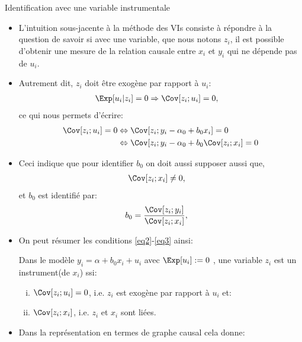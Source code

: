 \begin{frame}[allowframebreaks]{Identification avec une variable instrumentale}
    \begin{itemize}
\item L'intuition sous-jacente à la méthode des VIs consiste à répondre à la question 
de savoir si avec une variable, que nous notons $z_i$, il est possible d'obtenir 
une mesure de la relation causale entre $x_i$ et $y_i$ qui ne dépende pas de $u_i$.
\item Autrement dit, $z_i$ doit être exogène par rapport à $u_i$:
\begin{align}
\Exp[u_i| z_i] = 0 &\Rightarrow \Cov[z_i; u_i]= 0,
    \label{eq2}
\end{align}
ce qui nous permets d'écrire:
\begin{align*}
    \Cov[z_i; u_i]= 0 &\Leftrightarrow 
    \Cov[z_i; y_i - \alpha_0 +b_0x_i] = 0\\
    &\Leftrightarrow \Cov[z_i; y_i - \alpha_0 +b_0\Cov[z_i;x_i] = 0
\end{align*}
\item Ceci indique que pour identifier $b_0$  on doit aussi supposer aussi que,
\begin{align}
\Cov[z_i;x_i]  &\neq 0,
\label{eq3}
\end{align}
et $b_0$ est identifié par:
\begin{align}
b_0 &= \frac{\Cov[z_i; y_i]}{\Cov[z_i;x_i]},
    \label{eq4}
\end{align}
\framebreak

\item On peut résumer les conditions \eqref{eq2}-\eqref{eq3} ainsi: 

\begin{definition_fr}
    Dans le modèle $y_i = \alpha + b_0x_i + u_i$ avec $\Exp[u_i] := 0$ , une variable $z_i$ 
    est un instrument(de $x_i$) ssi:
    \begin{enumerate}[(i)]
\item $\Cov[z_i ;u_i ]= 0$, i.e. $z_i$ est exogène par rapport à $u_i$ et:
\item $\Cov[z_i;x_i]$, i.e. $z_i$ et $x_i$ sont liées.
\end{enumerate}
\end{definition_fr}

\item Dans la représentation en termes de graphe causal cela donne:


\end{itemize}
\end{frame}
